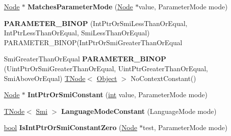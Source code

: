 \begin{DoxyCompactItemize}
\item 
\mbox{\label{classv8_1_1internal_1_1CodeStubAssembler_aa3aa1ac6bb3097df062d8a514840accb}} 
\mbox{\hyperlink{classv8_1_1internal_1_1compiler_1_1Node}{Node}} $\ast$ {\bfseries Matches\+Parameter\+Mode} (\mbox{\hyperlink{classv8_1_1internal_1_1compiler_1_1Node}{Node}} $\ast$value, Parameter\+Mode mode)
\item 
\mbox{\label{classv8_1_1internal_1_1CodeStubAssembler_a958d80cc78ca35ff0dc040625a2cde75}} 
{\bfseries P\+A\+R\+A\+M\+E\+T\+E\+R\+\_\+\+B\+I\+N\+OP} (Int\+Ptr\+Or\+Smi\+Less\+Than\+Or\+Equal, Int\+Ptr\+Less\+Than\+Or\+Equal, Smi\+Less\+Than\+Or\+Equal) P\+A\+R\+A\+M\+E\+T\+E\+R\+\_\+\+B\+I\+N\+OP(Int\+Ptr\+Or\+Smi\+Greater\+Than\+Or\+Equal
\item 
\mbox{\label{classv8_1_1internal_1_1CodeStubAssembler_acb6d1e68abedea3022ae3e2d80e4ad58}} 
Smi\+Greater\+Than\+Or\+Equal {\bfseries P\+A\+R\+A\+M\+E\+T\+E\+R\+\_\+\+B\+I\+N\+OP} (Uint\+Ptr\+Or\+Smi\+Greater\+Than\+Or\+Equal, Uint\+Ptr\+Greater\+Than\+Or\+Equal, Smi\+Above\+Or\+Equal) \mbox{\hyperlink{classv8_1_1internal_1_1compiler_1_1TNode}{T\+Node}}$<$ \mbox{\hyperlink{classv8_1_1internal_1_1Object}{Object}} $>$ No\+Context\+Constant()
\item 
\mbox{\label{classv8_1_1internal_1_1CodeStubAssembler_aa77bf4a70ab0478a262eb2cf193baec5}} 
\mbox{\hyperlink{classv8_1_1internal_1_1compiler_1_1Node}{Node}} $\ast$ {\bfseries Int\+Ptr\+Or\+Smi\+Constant} (\mbox{\hyperlink{classint}{int}} value, Parameter\+Mode mode)
\item 
\mbox{\label{classv8_1_1internal_1_1CodeStubAssembler_a18d8d89083074a4fa14f9983d52ef6f2}} 
\mbox{\hyperlink{classv8_1_1internal_1_1compiler_1_1TNode}{T\+Node}}$<$ \mbox{\hyperlink{classv8_1_1internal_1_1Smi}{Smi}} $>$ {\bfseries Language\+Mode\+Constant} (Language\+Mode mode)
\item 
\mbox{\label{classv8_1_1internal_1_1CodeStubAssembler_a3eb5f1bbaa4d207337f7346f314606c8}} 
\mbox{\hyperlink{classbool}{bool}} {\bfseries Is\+Int\+Ptr\+Or\+Smi\+Constant\+Zero} (\mbox{\hyperlink{classv8_1_1internal_1_1compiler_1_1Node}{Node}} $\ast$test, Parameter\+Mode mode)

\end{DoxyCompactItemize}
